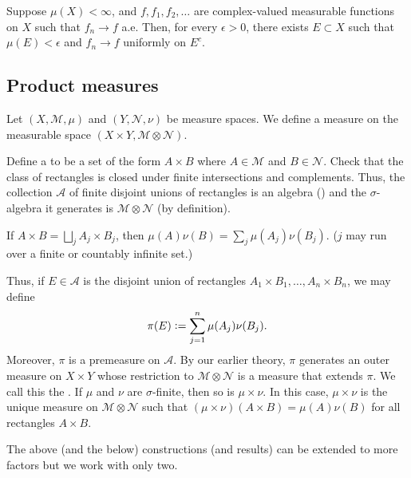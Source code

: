 \documentclass[12pt]{article}	%
\begin{document}
\begin{thm}
	Suppose $\mu(X) < \infty$, and $f, f_{1}, f_{2}, \ldots$ are complex-valued measurable functions on $X$ such that $f_{n} \to f$ a.e. \newline
	Then, for every $\epsilon > 0$, there exists $E \subset X$ such that $\mu(E) < \epsilon$ and $f_{n} \to f$ uniformly on $E^{c}$.
\end{thm}

\subsection{Product measures}

Let $(X, \mathcal{M}, \mu)$ and $(Y, \mathcal{N}, \nu)$ be measure spaces. We define a measure on the measurable space $(X \times Y, \mathcal{M} \otimes \mathcal{N})$. 

Define a  to be a set of the form $A \times B$ where $A \in \mathcal{M}$ and $B \in \mathcal{N}$. Check that the class of rectangles is closed under finite intersections and complements. Thus, the collection $\mathcal{A}$ of finite disjoint unions of rectangles is an algebra () and the $\sigma$-algebra it generates is $\mathcal{M} \otimes \mathcal{N}$ (by definition).

\begin{exe}
	If $A \times B = \bigsqcup_{j} A_{j} \times B_{j}$, then $\mu(A) \nu(B) = \sum_{j} \mu(A_{j}) \nu(B_{j})$. ($j$ may run over a finite or countably infinite set.)
\end{exe}

Thus, if $E \in \mathcal{A}$ is the disjoint union of rectangles $A_{1} \times B_{1}, \ldots, A_{n} \times B_{n}$, we may define
\begin{equation*} 
	\pi(E) \vcentcolon= \sum_{j = 1}^{n} \mu(A_{j}) \nu(B_{j}).
\end{equation*}
Moreover, $\pi$ is a premeasure on $\mathcal{A}$. By our earlier theory, $\pi$ generates an outer measure on $X \times Y$ whose restriction to $\mathcal{M} \otimes \mathcal{N}$ is a measure that extends $\pi$. We call this the . If $\mu$ and $\nu$ are $\sigma$-finite, then so is $\mu \times \nu$. In this case, $\mu \times \nu$ is the unique measure on $\mathcal{M} \otimes \mathcal{N}$ such that $(\mu \times \nu)(A \times B) = \mu(A) \nu(B)$ for all rectangles $A \times B$. 

The above (and the below) constructions (and results) can be extended to more factors but we work with only two.
\end{document}
